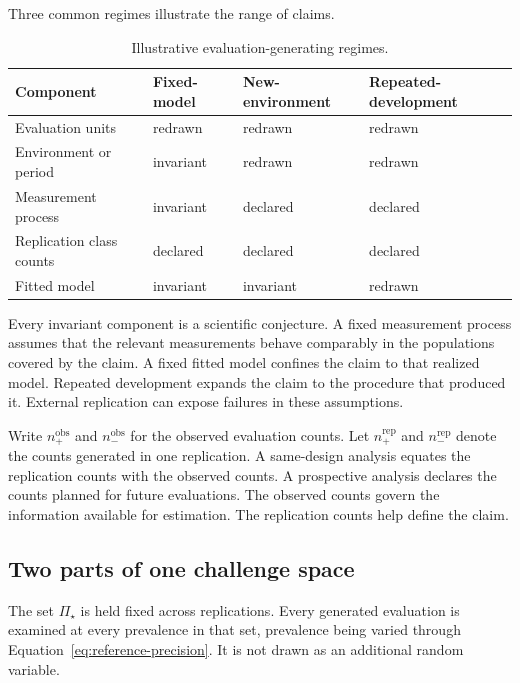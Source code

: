 \documentclass[11pt]{article}
\newcommand{\PSet}{\Pi_\star}
\theoremstyle{remark}
\begin{document}
Three common regimes illustrate the range of claims.

\begin{table}[ht]
\centering
\caption{Illustrative evaluation-generating regimes.}
\label{tab:regimes}
\begin{tabularx}{\textwidth}{@{}>{\raggedright\arraybackslash}p{}XXX@{}}
\toprule
Component & Fixed-model & New-environment & Repeated-development \\
\midrule
Evaluation units & redrawn & redrawn & redrawn \\
Environment or period & invariant & redrawn & redrawn \\
Measurement process & invariant & declared & declared \\
Replication class counts & declared & declared & declared \\
Fitted model & invariant & invariant & redrawn \\
\bottomrule
\end{tabularx}
\end{table}

Every invariant component is a scientific conjecture. A fixed measurement process assumes that the relevant measurements behave comparably in the populations covered by the claim. A fixed fitted model confines the claim to that realized model. Repeated development expands the claim to the procedure that produced it. External replication can expose failures in these assumptions.

Write $n_+^{\mathrm{obs}}$ and $n_-^{\mathrm{obs}}$ for the observed evaluation counts. Let $n_+^{\mathrm{rep}}$ and $n_-^{\mathrm{rep}}$ denote the counts generated in one replication. A same-design analysis equates the replication counts with the observed counts. A prospective analysis declares the counts planned for future evaluations. The observed counts govern the information available for estimation. The replication counts help define the claim.

\subsection{Two parts of one challenge space}
\label{sec:challenge-space}

The set $\PSet$ is held fixed across replications. Every generated evaluation is examined at every prevalence in that set, prevalence being varied through Equation~\eqref{eq:reference-precision}. It is not drawn as an additional random variable.
\end{document}
